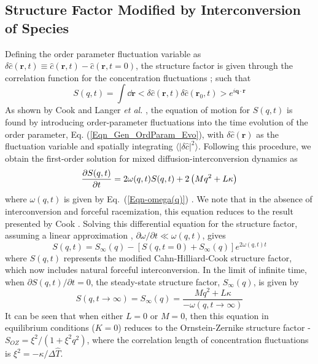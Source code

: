 \documentclass[5p,twocolumn]{elsarticle}
\renewcommand{\vec}[1]{\ensuremath{\boldsymbol{\mathbf{#1}}}}
\begin{document}
\subsection{Structure Factor Modified by Interconversion of Species}
Defining the order parameter fluctuation variable as $\delta \hat{c}(\vec{r},t) \equiv \hat{c}(\vec{r},t)-\hat{c}(\vec{r},t=0)$, the structure factor is given through the correlation function for the concentration fluctuations \cite{Bray_Theory_2002}; such that
\begin{equation}
	S(q,t) = \int \dd{\vec{r}}<\delta \hat{c}(\vec{r},t)\delta \hat{c}(\vec{r}_0,t)>e^{i\vec{q}\cdot\vec{r} }
\end{equation} 
As shown by Cook \cite{cook_brownian_1970} and Langer \textit{et al.} \cite{langer_new_1975}, the equation of motion for $S(q,t)$ is found by introducing order-parameter fluctuations into the time evolution of the order parameter, Eq. (\ref{Eqn_Gen_OrdParam_Evo}), with $\delta\hat{c}(\vec{r})$ as the fluctuation variable and spatially integrating $\langle|\delta\hat{c}|^2\rangle$. Following this procedure, we obtain the first-order solution for mixed diffusion-interconversion dynamics as
\begin{equation}
	\pdv{S(q,t)}{t} = 2\omega(q,t)S(q,t) + 2\left(Mq^2 + L\kappa\right)
\end{equation}
where $\omega(q,t)$ is given by Eq.~(\ref{Eqn-omega(q)}) \cite{Glotzer_consistent_1994,Coniglio_Multiscaling_1989,Coniglio_Novel_1990}. We note that in the absence of interconversion and forceful racemization, this equation reduces to the result presented by Cook \cite{cook_brownian_1970}. Solving this differential equation for the structure factor, assuming a linear approximation \cite{Langer_Theory_1973}, $\partial\omega/\partial t \ll \omega(q,t)$, gives \cite{Billotet_Dynamic_1980,Binder_Theory_1978,binder_collective_1983,Stobl_Structure_1985}
\begin{equation}\label{Eqn_Sqt_long}
    S(q,t) = S_\infty(q) - \left[S(q,t=0)+S_\infty(q)\right]e^{2\omega(q,t)t}
\end{equation}
where $S(q,t)$ represents the modified Cahn-Hilliard-Cook structure factor, which now includes natural forceful interconversion. In the limit of infinite time, when $\partial S(q,t)/\partial t=0$, the steady-state structure factor, $S_\infty(q)$, is given by
\begin{equation}\label{Eq-Schi}
	S(q,t\to\infty) = S_\infty(q) = \frac{Mq^2 + L\kappa}{-\omega(q,t\to\infty)}
\end{equation}
It can be seen that when either $L=0$ or $M=0$, then this equation in equilibrium conditions ($K=0$) reduces to the Ornstein-Zernike structure factor - $S_{OZ} =  \xi^2/(1+\xi^2q^2)$, where the correlation length of concentration fluctuations is $\xi^2 = -\kappa/\Delta\hat{T}$.
\end{document}
